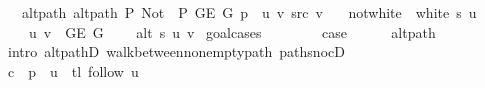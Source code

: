 \begin{isabellebody}
\ \ \ alt{\isacharunderscore}{\kern0pt}path{\isacharcolon}{\kern0pt}\ {\isachardoublequoteopen}alt{\isacharunderscore}{\kern0pt}path\ P{\isacharprime}{\kern0pt}{\isacharprime}{\kern0pt}\ {\isacharparenleft}{\kern0pt}Not\ {\isasymcirc}\ P{\isacharprime}{\kern0pt}{\isacharprime}{\kern0pt}{\isacharparenright}{\kern0pt}\ {\isacharparenleft}{\kern0pt}G{\isachardot}{\kern0pt}E\ G{\isacharparenright}{\kern0pt}\ {\isacharparenleft}{\kern0pt}p\ {\isacharat}{\kern0pt}\ {\isacharbrackleft}{\kern0pt}u{\isacharcomma}{\kern0pt}\ v{\isacharbrackright}{\kern0pt}{\isacharparenright}{\kern0pt}\ src\ v{\isachardoublequoteclose}\isanewline
\ \ \ not{\isacharunderscore}{\kern0pt}white{\isacharcolon}{\kern0pt}\ {\isachardoublequoteopen}{\isasymnot}\ white\ s\ u{\isachardoublequoteclose}\isanewline
\ \ \isanewline
\ \ \ \ {\isachardoublequoteopen}{\isacharbraceleft}{\kern0pt}u{\isacharcomma}{\kern0pt}\ v{\isacharbraceright}{\kern0pt}\ {\isasymin}\ G{\isachardot}{\kern0pt}E\ G{\isachardoublequoteclose}\isanewline
\ \ \ \ {\isachardoublequoteopen}alt\ s\ u\ v{\isachardoublequoteclose}\isanewline
%
\isadelimproof
%
\endisadelimproof
%
\isatagproof
{}\isamarkupfalse%
\ {\isacharparenleft}{\kern0pt}goal{\isacharunderscore}{\kern0pt}cases{\isacharparenright}{\kern0pt}\isanewline
\ \ \isamarkupfalse%
\ {}\isanewline
\ \ \isamarkupfalse%
\ {\isacharquery}{\kern0pt}case\isanewline
\ \ \ \ \isamarkupfalse%
\ alt{\isacharunderscore}{\kern0pt}path\isanewline
\ \ \ \ \isamarkupfalse%
\ {\isacharparenleft}{\kern0pt}intro\ alt{\isacharunderscore}{\kern0pt}pathD{\isacharparenleft}{\kern0pt}{}{\isacharparenright}{\kern0pt}\ walk{\isacharunderscore}{\kern0pt}between{\isacharunderscore}{\kern0pt}nonempty{\isacharunderscore}{\kern0pt}path{\isacharparenleft}{\kern0pt}{}{\isacharparenright}{\kern0pt}\ path{\isacharunderscore}{\kern0pt}snocD{\isacharparenright}{\kern0pt}\isanewline
{}\isamarkupfalse%
\isanewline
\ \ \isamarkupfalse%
\ {}\isanewline
\ \ \isacommand{{\isacharbraceleft}{\kern0pt}}\isamarkupfalse%
\ \isamarkupfalse%
\ {\isacharquery}{\kern0pt}c\ {\isacharequal}{\kern0pt}\ {\isachardoublequoteopen}p\ {\isacharat}{\kern0pt}\ {\isacharbrackleft}{\kern0pt}u{\isacharbrackright}{\kern0pt}\ {\isacharat}{\kern0pt}\ tl\ {\isacharparenleft}{\kern0pt}follow\ u{\isacharparenright}{\kern0pt}{\isachardoublequoteclose}\isanewline
\ \ \ \ \isamarkupfalse%

\end{isabellebody}
